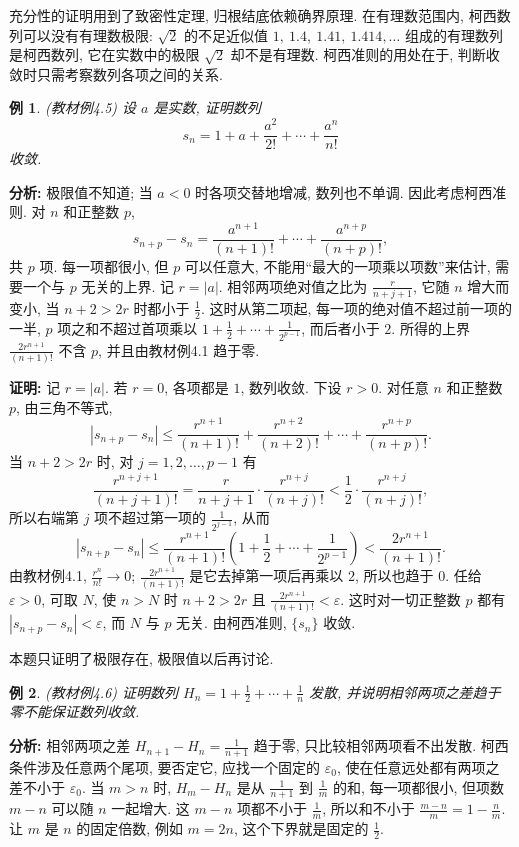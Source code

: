 \documentclass[UTF8,openany]{ctexbook}
\theoremstyle{chinesetextbook}
\newtheorem{example}{例}[section]
\newenvironment{cnproof}{\par\indent\textbf{证明:} \ignorespaces}{\par}
\begin{document}
充分性的证明用到了致密性定理, 归根结底依赖确界原理. 在有理数范围内, 柯西数列可以没有有理数极限: $\sqrt2$ 的不足近似值 $1,\ 1.4,\ 1.41,\ 1.414,\ldots$ 组成的有理数列是柯西数列, 它在实数中的极限 $\sqrt2$ 却不是有理数. 柯西准则的用处在于, 判断收敛时只需考察数列各项之间的关系.
\begin{example}
\textnormal{(教材例4.5)} 设 $a$ 是实数, 证明数列
\[
s_n=1+a+\frac{a^2}{2!}+\cdots+\frac{a^n}{n!}
\]
收敛.
\end{example}
\par\indent\textbf{分析:} 极限值不知道; 当 $a<0$ 时各项交替地增减, 数列也不单调. 因此考虑柯西准则. 对 $n$ 和正整数 $p$,
\[
s_{n+p}-s_n=\frac{a^{n+1}}{(n+1)!}+\cdots+\frac{a^{n+p}}{(n+p)!},
\]
共 $p$ 项. 每一项都很小, 但 $p$ 可以任意大, 不能用“最大的一项乘以项数”来估计, 需要一个与 $p$ 无关的上界. 记 $r=|a|$. 相邻两项绝对值之比为 $\displaystyle\frac r{n+j+1}$, 它随 $n$ 增大而变小, 当 $n+2>2r$ 时都小于 $\displaystyle\frac12$. 这时从第二项起, 每一项的绝对值不超过前一项的一半, $p$ 项之和不超过首项乘以 $\displaystyle1+\frac12+\cdots+\frac1{2^{p-1}}$, 而后者小于 $2$. 所得的上界 $\displaystyle\frac{2r^{n+1}}{(n+1)!}$ 不含 $p$, 并且由教材例4.1 趋于零.
\begin{cnproof}
记 $r=|a|$. 若 $r=0$, 各项都是 $1$, 数列收敛. 下设 $r>0$. 对任意 $n$ 和正整数 $p$, 由三角不等式,
\[
|s_{n+p}-s_n|\le\frac{r^{n+1}}{(n+1)!}+\frac{r^{n+2}}{(n+2)!}+\cdots+\frac{r^{n+p}}{(n+p)!}.
\]
当 $n+2>2r$ 时, 对 $j=1,2,\ldots,p-1$ 有
\[
\frac{r^{n+j+1}}{(n+j+1)!}=\frac r{n+j+1}\cdot\frac{r^{n+j}}{(n+j)!}<\frac12\cdot\frac{r^{n+j}}{(n+j)!},
\]
所以右端第 $j$ 项不超过第一项的 $\displaystyle\frac1{2^{j-1}}$, 从而
\[
|s_{n+p}-s_n|\le\frac{r^{n+1}}{(n+1)!}\left(1+\frac12+\cdots+\frac1{2^{p-1}}\right)<\frac{2r^{n+1}}{(n+1)!}.
\]
由教材例4.1, $\displaystyle\frac{r^n}{n!}\to0$; $\displaystyle\frac{2r^{n+1}}{(n+1)!}$ 是它去掉第一项后再乘以 $2$, 所以也趋于 $0$. 任给 $\varepsilon>0$, 可取 $N$, 使 $n>N$ 时 $n+2>2r$ 且 $\displaystyle\frac{2r^{n+1}}{(n+1)!}<\varepsilon$. 这时对一切正整数 $p$ 都有 $|s_{n+p}-s_n|<\varepsilon$, 而 $N$ 与 $p$ 无关. 由柯西准则, $\{s_n\}$ 收敛.
\end{cnproof}
本题只证明了极限存在, 极限值以后再讨论.
\begin{example}
\textnormal{(教材例4.6)} 证明数列 $\displaystyle H_n=1+\frac12+\cdots+\frac1n$ 发散, 并说明相邻两项之差趋于零不能保证数列收敛.
\end{example}
\par\indent\textbf{分析:} 相邻两项之差 $\displaystyle H_{n+1}-H_n=\frac1{n+1}$ 趋于零, 只比较相邻两项看不出发散. 柯西条件涉及任意两个尾项, 要否定它, 应找一个固定的 $\varepsilon_0$, 使在任意远处都有两项之差不小于 $\varepsilon_0$. 当 $m>n$ 时, $H_m-H_n$ 是从 $\displaystyle\frac1{n+1}$ 到 $\displaystyle\frac1m$ 的和, 每一项都很小, 但项数 $m-n$ 可以随 $n$ 一起增大. 这 $m-n$ 项都不小于 $\displaystyle\frac1m$, 所以和不小于 $\displaystyle\frac{m-n}m=1-\frac nm$. 让 $m$ 是 $n$ 的固定倍数, 例如 $m=2n$, 这个下界就是固定的 $\displaystyle\frac12$.
\end{document}
